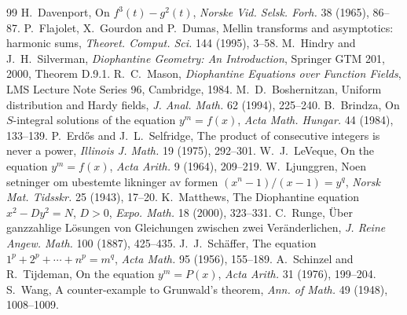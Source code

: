 \documentclass[11pt]{amsart}
\theoremstyle{definition}
\theoremstyle{remark}
\begin{document}
\begin{thebibliography}{99}
 H.~Davenport, On $f^3(t)-g^2(t)$, \emph{Norske Vid. Selsk. Forh.} 38 (1965), 86--87.
 P.~Flajolet, X.~Gourdon and P.~Dumas, Mellin transforms and asymptotics: harmonic sums, \emph{Theoret. Comput. Sci.} 144 (1995), 3--58.
 M.~Hindry and J.~H.~Silverman, \emph{Diophantine Geometry: An Introduction}, Springer GTM 201, 2000, Theorem D.9.1.
 R.~C.~Mason, \emph{Diophantine Equations over Function Fields}, LMS Lecture Note Series 96, Cambridge, 1984.
 M.~D.~Boshernitzan, Uniform distribution and Hardy fields, \emph{J. Anal. Math.} 62 (1994), 225--240.
 B.~Brindza, On $S$-integral solutions of the equation $y^m=f(x)$, \emph{Acta Math. Hungar.} 44 (1984), 133--139.
 P.~Erd\H{o}s and J.~L.~Selfridge, The product of consecutive integers is never a power, \emph{Illinois J. Math.} 19 (1975), 292--301.
 W.~J.~LeVeque, On the equation $y^m=f(x)$, \emph{Acta Arith.} 9 (1964), 209--219.
 W.~Ljunggren, Noen setninger om ubestemte likninger av formen $(x^n-1)/(x-1)=y^q$, \emph{Norsk Mat. Tidsskr.} 25 (1943), 17--20.
 K.~Matthews, The Diophantine equation $x^2-Dy^2=N$, $D>0$, \emph{Expo. Math.} 18 (2000), 323--331.
 C.~Runge, \"Uber ganzzahlige L\"osungen von Gleichungen zwischen zwei Ver\"anderlichen, \emph{J. Reine Angew. Math.} 100 (1887), 425--435.
 J.~J.~Sch\"affer, The equation $1^p+2^p+\cdots+n^p=m^q$, \emph{Acta Math.} 95 (1956), 155--189.
 A.~Schinzel and R.~Tijdeman, On the equation $y^m=P(x)$, \emph{Acta Arith.} 31 (1976), 199--204.
 S.~Wang, A counter-example to Grunwald's theorem, \emph{Ann. of Math.} 49 (1948), 1008--1009.
\end{thebibliography}
\end{document}
